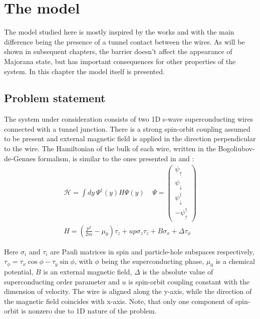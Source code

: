 \newcommand{\xbr}{\left(x\right)}
\newcommand{\br}[1]{\left(#1\right)}
\newcommand{\abs}[1]{\left|#1\right|}
\newcommand{\pdy}{\partial_y}
\newcommand{\pd}[1]{\partial_{#1}}
\newcommand{\brf}[1]{\left\{#1\right\}}

\chapter{The model}
\label{chap:model}

The model studied here is mostly inspired by the works \cite{Oreg_2010} and \cite{Lutchyn_2010} with the main difference being the presence of a tunnel contact between the wires. As will be shown in subsequent chapters, the barrier doesn't affect the appearance of Majorana state, but has important consequences for other properties of the system. In this chapter the model itself is presented.

\section{Problem statement}

The system under consideration consists of two 1D s-wave superconducting wires connected with a tunnel junction. There is a strong spin-orbit coupling assumed to be present and external magnetic field is applied in the direction perpendicular to the wire. The Hamiltonian of the bulk of each wire, written in the Bogoliubov-de-Gennes formalism, is similar to the ones presented in \cite{Oreg_2010} and \cite{Lutchyn_2010}:
\begin{gather}
	\mathcal{H}
	=
	\int dy ~
	\Psi^\dagger
	\br{y}
	H
	\Psi
	\br{y}
	\
	~~~~
	\Psi
	=
	\begin{pmatrix}
		\psi_\uparrow
		\\
		\psi_\downarrow
		\\
		\psi_\downarrow^\dagger
		\\
		-\psi_\uparrow^\dagger
	\end{pmatrix}
	\\
	\label{bulk_Hamiltonian}
	H
	=
	\br{
		\frac{p^2}{2m}
		-\mu_0
	}\tau_z
	+
	u p \sigma_z \tau_z
	+
	B\sigma_x	
	+
	\Delta\tau_\phi
\end{gather}

Here $ \sigma_i $ and $ \tau_i $ are Pauli matrices in spin and particle-hole subspaces respectively, $ \tau_\phi = \tau_x \cos\phi - \tau_y \sin\phi$, with $ \phi $ being the superconducting phase, $ \mu_0 $ is a chemical potential, $ B $ is an external magnetic field, $ \Delta $ is the absolute value of superconducting order parameter and $ u $ is spin-orbit coupling constant with the dimension of velocity. The wire is aligned along the y-axis, while the direction of the magnetic field coincides with x-axis. Note, that only one component of spin-orbit is nonzero due to 1D nature of the problem.

